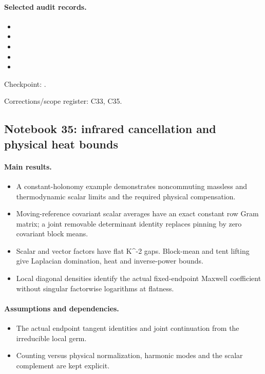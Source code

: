 \paragraph{Selected audit records.}
\begingroup\small
\begin{itemize}
\item {}
\item {}
\item {}
\item {}
\item {}
\end{itemize}
\endgroup

Checkpoint: .\par
Corrections/scope register: C33, C35.\par

\subsection{Notebook 35: infrared cancellation and physical heat bounds}
\label{hnc-35}
\noindent{}\par

\paragraph{Main results.}
\begin{itemize}
\item A constant-holonomy example demonstrates noncommuting massless and thermodynamic scalar limits and the required physical compensation.
\item Moving-reference covariant scalar averages have an exact constant row Gram matrix; a joint removable determinant identity replaces pinning by zero covariant block means.
\item Scalar and vector factors have flat K\textasciicircum{}-2 gaps. Block-mean and tent lifting give Laplacian domination, heat and inverse-power bounds.
\item Local diagonal densities identify the actual fixed-endpoint Maxwell coefficient without singular factorwise logarithms at flatness.
\end{itemize}

\paragraph{Assumptions and dependencies.}
\begin{itemize}
\item The actual endpoint tangent identities and joint continuation from the irreducible local germ.
\item Counting versus physical normalization, harmonic modes and the scalar complement are kept explicit.
\end{itemize}

